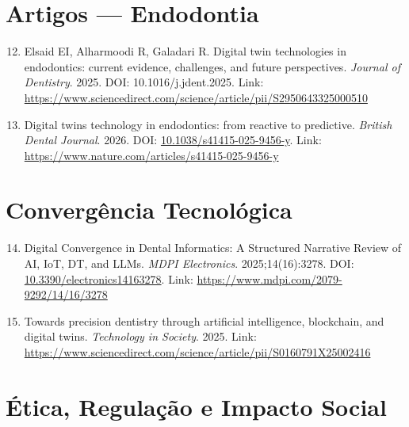\section{Artigos — Endodontia}

\begin{enumerate}
    \setcounter{enumi}{11}
    \item \label{ref:elsaid2025} Elsaid EI, Alharmoodi R, Galadari R. Digital twin technologies in endodontics: current evidence, challenges, and future perspectives. \textit{Journal of Dentistry}. 2025. DOI: 10.1016/j.jdent.2025. Link: \url{https://www.sciencedirect.com/science/article/pii/S2950643325000510}
    
    \item \label{ref:nature2026} Digital twins technology in endodontics: from reactive to predictive. \textit{British Dental Journal}. 2026. DOI: \href{https://doi.org/10.1038/s41415-025-9456-y}{10.1038/s41415-025-9456-y}. Link: \url{https://www.nature.com/articles/s41415-025-9456-y}
\end{enumerate}

\section{Convergência Tecnológica}

\begin{enumerate}
    \setcounter{enumi}{13}
    \item \label{ref:mdpi2025} Digital Convergence in Dental Informatics: A Structured Narrative Review of AI, IoT, DT, and LLMs. \textit{MDPI Electronics}. 2025;14(16):3278. DOI: \href{https://doi.org/10.3390/electronics14163278}{10.3390/electronics14163278}. Link: \url{https://www.mdpi.com/2079-9292/14/16/3278}
    
    \item \label{ref:techsoc2025} Towards precision dentistry through artificial intelligence, blockchain, and digital twins. \textit{Technology in Society}. 2025. Link: \url{https://www.sciencedirect.com/science/article/pii/S0160791X25002416}
\end{enumerate}

\section{Ética, Regulação e Impacto Social}

